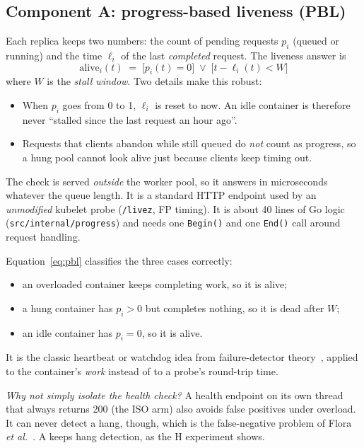 \documentclass[conference]{IEEEtran}
\begin{document}
\subsection{Component A: progress-based liveness (PBL)}
Each replica keeps two numbers: the count of pending requests $p_i$
(queued or running) and the time $\ell_i$ of the last \emph{completed}
request. The liveness answer is
\begin{equation}
\mathrm{alive}_i(t) \;=\; \big[p_i(t)=0\big] \;\lor\; \big[t-\ell_i(t) < W\big]
\label{eq:pbl}
\end{equation}
where $W$ is the \emph{stall window}. Two details make this robust:
\begin{itemize}
\item When $p_i$ goes from 0 to 1, $\ell_i$ is reset to now. An idle
  container is therefore never ``stalled since the last request an hour
  ago''.
\item Requests that clients abandon while still queued do \emph{not}
  count as progress, so a hung pool cannot look alive just because
  clients keep timing out.
\end{itemize}
The check is served \emph{outside} the worker pool, so it answers in
microseconds whatever the queue length. It is a standard HTTP endpoint
used by an \emph{unmodified} kubelet probe (\texttt{/livez}, FP timing).
It is about 40 lines of Go logic (\texttt{src/internal/progress}) and needs one
\texttt{Begin()} and one \texttt{End()} call around request handling.

Equation~\eqref{eq:pbl} classifies the three cases correctly:
\begin{itemize}
\item an overloaded container keeps completing work, so it is alive;
\item a hung container has $p_i>0$ but completes nothing, so it is dead
  after $W$;
\item an idle container has $p_i=0$, so it is alive.
\end{itemize}
It is the classic heartbeat or watchdog idea from failure-detector
theory~\cite{chandra1996,hayashibara2004}, applied to the container's
\emph{work} instead of to a probe's round-trip time.

\emph{Why not simply isolate the health check?} A health endpoint on its
own thread that always returns 200 (the ISO arm) also avoids false
positives under overload. It can never detect a hang, though, which is
the false-negative problem of Flora \emph{et al.}~\cite{flora2022}. A
keeps hang detection, as the H experiment shows.
\end{document}
